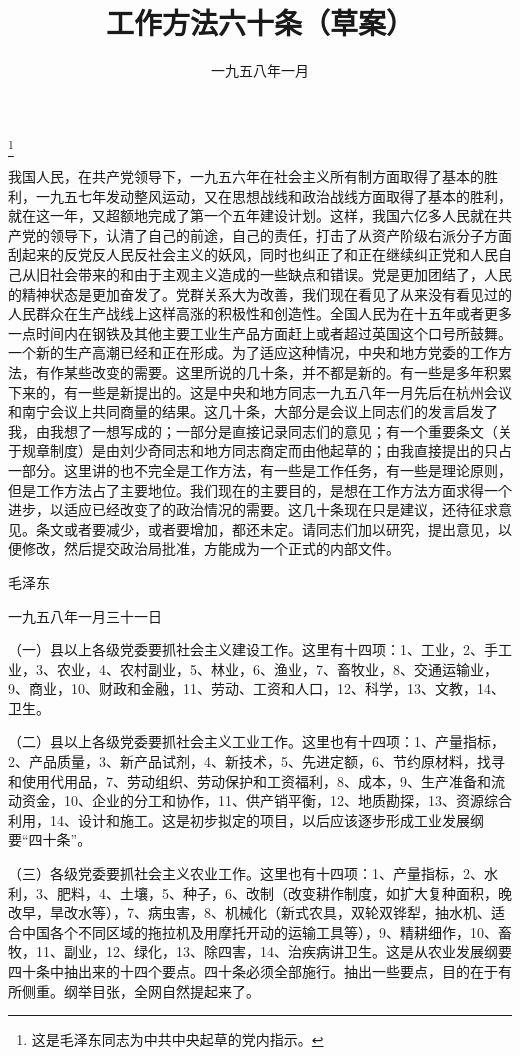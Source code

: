 
\title{工作方法六十条（草案）}
\date{一九五八年一月}
\thanks{这是毛泽东同志为中共中央起草的党内指示。}
\maketitle


我国人民，在共产党领导下，一九五六年在社会主义所有制方面取得了基本的胜利，一九五七年发动整风运动，又在思想战线和政治战线方面取得了基本的胜利，就在这一年，又超额地完成了第一个五年建设计划。这样，我国六亿多人民就在共产党的领导下，认清了自己的前途，自己的责任，打击了从资产阶级右派分子方面刮起来的反党反人民反社会主义的妖风，同时也纠正了和正在继续纠正党和人民自己从旧社会带来的和由于主观主义造成的一些缺点和错误。党是更加团结了，人民的精神状态是更加奋发了。党群关系大为改善，我们现在看见了从来没有看见过的人民群众在生产战线上这样高涨的积极性和创造性。全国人民为在十五年或者更多一点时间内在钢铁及其他主要工业生产品方面赶上或者超过英国这个口号所鼓舞。一个新的生产高潮已经和正在形成。为了适应这种情况，中央和地方党委的工作方法，有作某些改变的需要。这里所说的几十条，并不都是新的。有一些是多年积累下来的，有一些是新提出的。这是中央和地方同志一九五八年一月先后在杭州会议和南宁会议上共同商量的结果。这几十条，大部分是会议上同志们的发言启发了我，由我想了一想写成的；一部分是直接记录同志们的意见；有一个重要条文（关于规章制度）是由刘少奇同志和地方同志商定而由他起草的；由我直接提出的只占一部分。这里讲的也不完全是工作方法，有一些是工作任务，有一些是理论原则，但是工作方法占了主要地位。我们现在的主要目的，是想在工作方法方面求得一个进步，以适应已经改变了的政治情况的需要。这几十条现在只是建议，还待征求意见。条文或者要减少，或者要增加，都还未定。请同志们加以研究，提出意见，以便修改，然后提交政治局批准，方能成为一个正式的内部文件。

毛泽东

一九五八年一月三十一日

（一）县以上各级党委要抓社会主义建设工作。这里有十四项：1、工业，2、手工业，3、农业，4、农村副业，5、林业，6、渔业，7、畜牧业，8、交通运输业，9、商业，10、财政和金融，11、劳动、工资和人口，12、科学，13、文教，14、卫生。

（二）县以上各级党委要抓社会主义工业工作。这里也有十四项：1、产量指标，2、产品质量，3、新产品试剂，4、新技术，5、先进定额，6、节约原材料，找寻和使用代用品，7、劳动组织、劳动保护和工资福利，8、成本，9、生产准备和流动资金，10、企业的分工和协作，11、供产销平衡，12、地质勘探，13、资源综合利用，14、设计和施工。这是初步拟定的项目，以后应该逐步形成工业发展纲要“四十条”。

（三）各级党委要抓社会主义农业工作。这里也有十四项：1、产量指标，2、水利，3、肥料，4、土壤，5、种子，6、改制（改变耕作制度，如扩大复种面积，晚改早，旱改水等），7、病虫害，8、机械化（新式农具，双轮双铧犁，抽水机、适合中国各个不同区域的拖拉机及用摩托开动的运输工具等），9、精耕细作，10、畜牧，11、副业，12、绿化，13、除四害，14、治疾病讲卫生。这是从农业发展纲要四十条中抽出来的十四个要点。四十条必须全部施行。抽出一些要点，目的在于有所侧重。纲举目张，全网自然提起来了。


